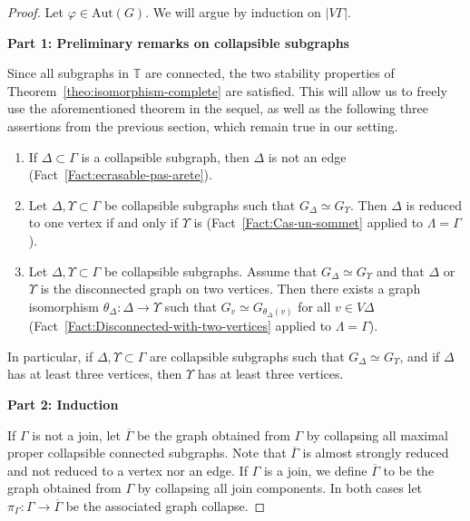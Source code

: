 \documentclass[a4paper,english,11pt]{article}
\theoremstyle{definition}
\theoremstyle{remark}
\newcommand{\Aut}{\mathrm{Aut}}
\begin{document}
\begin{proof} Let $\varphi\in \Aut(G)$. We will argue by induction on $|V\Gamma|$.

\begin{center}
    \textbf{Part 1: Preliminary remarks on collapsible subgraphs}
\end{center}

Since all subgraphs in $\mathbb{T}$ are connected, the two stability properties of Theorem~\ref{theo:isomorphism-complete} are satisfied. This will allow us to freely use the aforementioned theorem in the sequel, as well as the following three assertions from the previous section, which remain true in our setting.
\begin{enumerate}
    \item \label{item:remarks-on-collapsible-aut1} If $\Delta\subset \Gamma$ is a collapsible subgraph, then $\Delta$ is not an edge (Fact~\ref{Fact:ecrasable-pas-arete}).
    \item \label{item:remarks-on-collapsible-aut-un-sommet} Let $\Delta,\Upsilon \subset \Gamma$ be collapsible subgraphs such that $G_\Delta \simeq G_\Upsilon$. Then $\Delta$ is reduced to one vertex if and only if $\Upsilon$ is (Fact~\ref{Fact:Cas-un-sommet} applied to $\Lambda=\Gamma$).
    \item \label{item:remarks-on-collapsible-aut2} Let $\Delta,\Upsilon \subset \Gamma$ be collapsible subgraphs. Assume that $G_\Delta \simeq G_\Upsilon$ and that $\Delta$ or $\Upsilon$ is the disconnected graph on two vertices. Then there exists a graph isomorphism $\theta_\Delta:\Delta\rightarrow \Upsilon$ such that $G_{v}\simeq G_{\theta_\Delta(v)}$ for all $v\in V\Delta$
    (Fact~\ref{Fact:Disconnected-with-two-vertices} applied to $\Lambda=\Gamma$).
\end{enumerate}
In particular, if $\Delta,\Upsilon\subset\Gamma$ are collapsible subgraphs such that $G_\Delta\simeq G_\Upsilon$, and if $\Delta$ has at least three vertices, then $\Upsilon$ has at least three vertices.

\begin{center}
    \textbf{Part 2: Induction}
\end{center}

If $\Gamma$ is not a join, let $\overline{\Gamma}$ be the graph obtained from $\Gamma$ by collapsing all maximal proper collapsible connected subgraphs. Note that $\overline{\Gamma}$ is almost strongly reduced and not reduced to a vertex nor an edge. If $\Gamma$ is a join, we define $\overline{\Gamma}$ to be the graph obtained from $\Gamma$ by collapsing all join components. In both cases let $\pi_\Gamma:\Gamma\to\overline{\Gamma}$ be the associated graph collapse. 


\end{proof}
\end{document}
